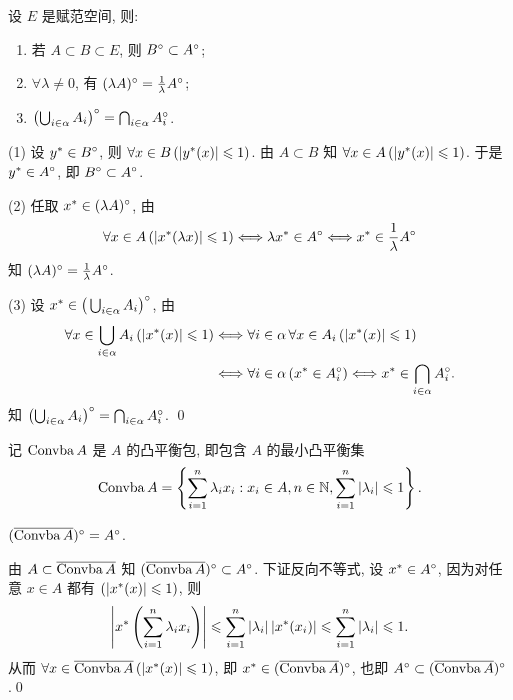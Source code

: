 	\begin{Proposition}
		设 $ E $ 是赋范空间, 则:
		\begin{enumerate}[(1)]
			\item 若 $ A\subset B\subset E $, 则 $ B^{\circ}\subset A^{\circ} $;
			\item $ \forall\lambda\ne 0 $, 有 $ (\lambda A)^{\circ}=\frac{1}{\lambda}A^{\circ} $;
			\item $\left( \bigcup_{i\in\alpha}A_{i} \right)^{\circ} = \bigcap_{i\in\alpha}A_{i}^{\circ} $.
		\end{enumerate}
	\end{Proposition}
	\begin{Proof}
		(1) 设 $ y^{*}\in B^{\circ} $, 则 $ \forall x\in B\,(\left| y^{*}(x) \right| \leqslant1) $. 由 $ A\subset B $ 知 $ \forall x\in A\,(\left| y^{*}(x) \right| \leqslant1) $. 于是 $ y^{*}\in A^{\circ} $, 即 $ B^{\circ}\subset A^{\circ} $.

		(2) 任取 $ x^{*}\in(\lambda A)^{\circ} $, 由
		\[
			\forall x\in A\,(\left| x^{*}(\lambda x) \right| \leqslant1)\Longleftrightarrow \lambda x^{*}\in A^{\circ}\Longleftrightarrow x^{*}\in \frac{1}{\lambda}A^{\circ}
		\]
		知 $ (\lambda A)^{\circ}=\frac{1}{\lambda}A^{\circ} $.

		(3) 设 $ x^{*}\in\big(\bigcup_{i\in\alpha}A_{i}\big)^{\circ} $, 由
		\[
			\begin{aligned}
				\forall x\in\bigcup_{i\in\alpha}A_{i}\,(\left| x^{*}(x) \right| \leqslant1) & \Longleftrightarrow\forall i\in\alpha\,\forall x\in A_{i}\,(\left| x^{*}(x) \right| \leqslant1) \\
				& \Longleftrightarrow \forall i\in\alpha\,(x^{*}\in A^{\circ}_{i})\Longleftrightarrow x^{*}\in\bigcap_{i\in\alpha}A_{i}^{\circ}.
			\end{aligned}
		\]
		知 $ \left( \bigcup_{i\in\alpha}A_{i} \right)^{\circ} = \bigcap_{i\in\alpha}A_{i}^{\circ} $. \qed
	\end{Proof}
	记 $ \operatorname{Convba} A $ 是 $ A $ 的凸平衡包, 即包含 $ A $ 的最小凸平衡集
	\[
		\operatorname{Convba} A=\left\{ \sum_{i=1}^{n}\lambda_{i}x_{i}: x_{i}\in A, n\in\mathbb{N}, \sum_{i=1}^{n}\left| \lambda_{i} \right| \leqslant1 \right\}.
	\]

	\begin{Proposition}
		$ (\overline{\operatorname{Convba} A})^{\circ}=A^{\circ} $.
	\end{Proposition}
	\begin{Proof}
		由 $ A\subset\overline{\operatorname{Convba} A} $ 知 $ (\overline{\operatorname{Convba} A})^{\circ}\subset A^{\circ} $. 下证反向不等式, 设 $ x^{*}\in A^{\circ} $, 因为对任意 $ x\in A $ 都有 $(\left| x^{*}(x) \right| \leqslant1) $, 则
		\[
			\left| x^{*}\left( \sum_{i=1}^{n}\lambda_{i}x_{i} \right) \right| \leqslant\sum_{i=1}^{n}\left| \lambda_{i} \right| \left| x^{*}(x_{i}) \right| \leqslant\sum_{i=1}^{n}\left| \lambda_{i} \right| \leqslant1.
		\]
		从而 $ \forall x\in\overline{\operatorname{Convba} A}\,(\left| x^{*}(x) \right| \leqslant1) $, 即 $ x^{*}\in(\overline{\operatorname{Convba} A})^{\circ} $, 也即 $ A^{\circ}\subset(\overline{\operatorname{Convba} A})^{\circ} $.\qed
	\end{Proof}
	

